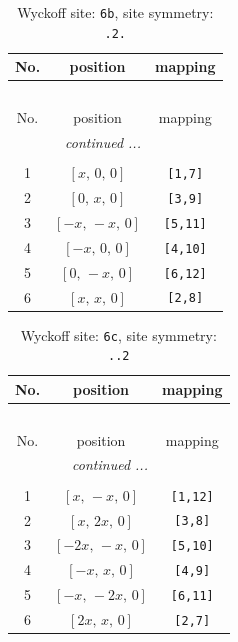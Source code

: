 \documentclass[fleqn,8pt]{jsarticle}
\begin{document}
\begin{longtable}{ccc}
\caption{Wyckoff site: {\tt 6b}, site symmetry: {\tt .2.}}
 \\
 \hline \hline
No. & position & mapping \\ \hline \endfirsthead

\multicolumn{2}{l}{\tablename\ \thetable{}} \\
 \hline \hline
No. & position & mapping \\ \hline \endhead

 \hline \hline
\multicolumn{2}{r}{\footnotesize\it continued ...} \\ \endfoot

 \hline \hline
\multicolumn{2}{r}{} \\ \endlastfoot

1 & $\left[ x,\, 0,\, 0 \right]$ & {\tt [1,7]} \\ \hline
2 & $\left[ 0,\, x,\, 0 \right]$ & {\tt [3,9]} \\ \hline
3 & $\left[ - x,\, - x,\, 0 \right]$ & {\tt [5,11]} \\ \hline
4 & $\left[ - x,\, 0,\, 0 \right]$ & {\tt [4,10]} \\ \hline
5 & $\left[ 0,\, - x,\, 0 \right]$ & {\tt [6,12]} \\ \hline
6 & $\left[ x,\, x,\, 0 \right]$ & {\tt [2,8]} \\
\end{longtable}
\renewcommand{\arraystretch}{1.2}
\begin{longtable}{ccc}
\caption{Wyckoff site: {\tt 6c}, site symmetry: {\tt ..2}}
 \\
 \hline \hline
No. & position & mapping \\ \hline \endfirsthead

\multicolumn{2}{l}{\tablename\ \thetable{}} \\
 \hline \hline
No. & position & mapping \\ \hline \endhead

 \hline \hline
\multicolumn{2}{r}{\footnotesize\it continued ...} \\ \endfoot

 \hline \hline
\multicolumn{2}{r}{} \\ \endlastfoot

1 & $\left[ x,\, - x,\, 0 \right]$ & {\tt [1,12]} \\ \hline
2 & $\left[ x,\, 2 x,\, 0 \right]$ & {\tt [3,8]} \\ \hline
3 & $\left[ - 2 x,\, - x,\, 0 \right]$ & {\tt [5,10]} \\ \hline
4 & $\left[ - x,\, x,\, 0 \right]$ & {\tt [4,9]} \\ \hline
5 & $\left[ - x,\, - 2 x,\, 0 \right]$ & {\tt [6,11]} \\ \hline
6 & $\left[ 2 x,\, x,\, 0 \right]$ & {\tt [2,7]} \\
\end{longtable}
\end{document}
